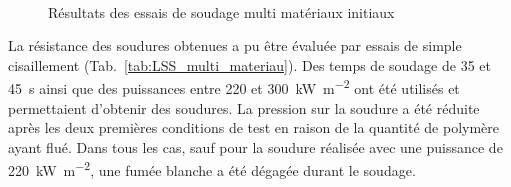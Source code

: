 \begin{figure}[h]
	\centering
	 \qquad
	 \\
	
	 \qquad
	\caption{Résultats des essais de soudage multi matériaux initiaux}
	\label{fig:MM_essais_initiaux}
\end{figure}

La résistance des soudures obtenues a pu être évaluée par essais de simple cisaillement (Tab.~\ref{tab:LSS_multi_materiau}). 
Des temps de soudage de 35 et \SI{45}{\second} ainsi que des puissances entre 220 et \SI{300}{\kilo\watt\per\square\metre} ont été utilisés et permettaient d'obtenir des soudures. 
La pression sur la soudure a été réduite après les deux premières conditions de test en raison de la quantité de polymère ayant flué. 
Dans tous les cas, sauf pour la soudure réalisée avec une puissance de \SI{220}{\kilo\watt\per\square\metre}, une fumée blanche a été dégagée durant le soudage. 

